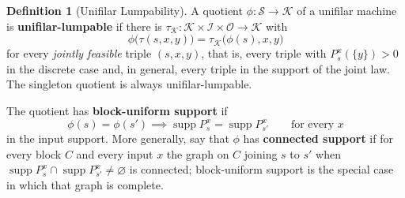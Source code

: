 \documentclass[12pt]{article}
\theoremstyle{definition}
\newtheorem{definition}[theorem]{Definition}
\DeclareMathOperator{\supp}{supp}
\begin{document}
\begin{definition}[Unifilar Lumpability]
\label{def:unifilar-lumpable}
A quotient $\phi:\mathcal S\to\mathcal K$ of a unifilar machine is
\textbf{unifilar-lumpable} if there is
$\tau_{\mathcal K}:\mathcal K\times\mathcal I\times\mathcal O\to\mathcal K$
with
\[
\phi\bigl(\tau(s,x,y)\bigr)=\tau_{\mathcal K}\bigl(\phi(s),x,y\bigr)
\]
for every \emph{jointly feasible} triple $(s,x,y)$, that is, every triple with
$P_s^x(\{y\})>0$ in the discrete case and, in general, every triple in the
support of the joint law.  The singleton quotient is always
unifilar-lumpable.

The quotient has \textbf{block-uniform support} if
\[
\phi(s)=\phi(s')
\implies
\supp P_s^x=\supp P_{s'}^x
\qquad\text{for every }x
\]
in the input support.  More generally, say that $\phi$ has \textbf{connected
support} if for every block $C$ and every input $x$ the graph on $C$ joining
$s$ to $s'$ when $\supp P_s^x\cap\supp P_{s'}^x\neq\varnothing$ is connected;
block-uniform support is the special case in which that graph is complete.
\end{definition}
\end{document}
